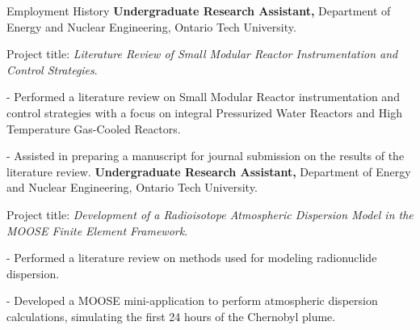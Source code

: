 \begin{rubric}{Employment History}
    \textbf{Undergraduate Research Assistant,} Department of Energy and Nuclear Engineering, Ontario Tech University.
    \par Project title: \emph{Literature Review of Small Modular Reactor Instrumentation and Control Strategies}.
    \par - Performed a literature review on Small Modular Reactor instrumentation and control strategies with a focus on integral Pressurized Water Reactors and High Temperature Gas-Cooled Reactors.
    \par - Assisted in preparing a manuscript for journal submission on the results of the literature review.
    \textbf{Undergraduate Research Assistant,} Department of Energy and Nuclear Engineering, Ontario Tech University.
    \par Project title: \emph{Development of a Radioisotope Atmospheric Dispersion Model in the MOOSE Finite Element Framework}.
    \par - Performed a literature review on methods used for modeling radionuclide dispersion.
    \par - Developed a MOOSE mini-application to perform atmospheric dispersion calculations, simulating the first 24 hours of the Chernobyl plume.
  \end{rubric}

